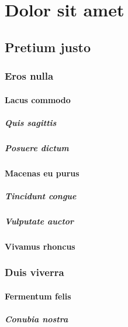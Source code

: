 \part{Dolor sit amet}

\chapter{Pretium justo}

 \lipsum[1-2]

\section{Eros nulla} \lipsum[3-4]
\subsection{Lacus commodo} \lipsum[5]
\subsubsection{Quis sagittis} \lipsum[6]
\subsubsection{Posuere dictum} \lipsum[7]
\subsection{Macenas eu purus} \lipsum[8]
\subsubsection{Tincidunt congue} \lipsum[9]
\subsubsection{Vulputate auctor} \lipsum[10]
\subsection{Vivamus rhoncus} \lipsum[11-12]

\section{Duis viverra} \lipsum[13-14]
\subsection{Fermentum felis} \lipsum[15]
\subsubsection{Conubia nostra} \lipsum[16]

